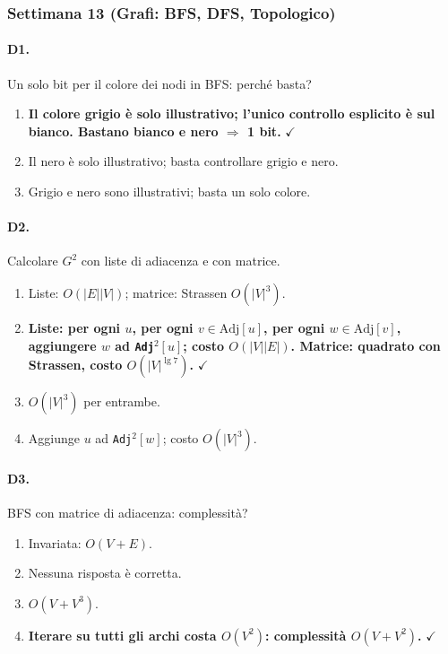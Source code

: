 \subsubsection{Settimana 13 (Grafi: BFS, DFS, Topologico)}

\paragraph{D1.} Un solo bit per il colore dei nodi in BFS: perch\'e basta?
\begin{enumerate}[label=\Alph*.,leftmargin=*]
	\item \textcolor{correctgreen}{\textbf{Il colore grigio \`e solo illustrativo; l'unico controllo esplicito \`e sul bianco. Bastano bianco e nero $\Rightarrow$ 1 bit.}} \hfill\textcolor{correctgreen}{$\checkmark$}
	\item Il nero \`e solo illustrativo; basta controllare grigio e nero.
	\item Grigio e nero sono illustrativi; basta un solo colore.
\end{enumerate}

\paragraph{D2.} Calcolare $G^2$ con liste di adiacenza e con matrice.
\begin{enumerate}[label=\Alph*.,leftmargin=*]
	\item Liste: $O(|E||V|)$; matrice: Strassen $O(|V|^3)$.
	\item \textcolor{correctgreen}{\textbf{Liste: per ogni $u$, per ogni $v\in\text{Adj}[u]$, per ogni $w\in\text{Adj}[v]$, aggiungere $w$ ad \texttt{Adj}$^2[u]$; costo $O(|V||E|)$. Matrice: quadrato con Strassen, costo $O(|V|^{\lg 7})$.}} \hfill\textcolor{correctgreen}{$\checkmark$}
	\item $O(|V|^3)$ per entrambe.
	\item Aggiunge $u$ ad \texttt{Adj}$^2[w]$; costo $O(|V|^3)$.
\end{enumerate}

\paragraph{D3.} BFS con matrice di adiacenza: complessit\`a?
\begin{enumerate}[label=\Alph*.,leftmargin=*]
	\item Invariata: $O(V+E)$.
	\item Nessuna risposta \`e corretta.
	\item $O(V+V^3)$.
	\item \textcolor{correctgreen}{\textbf{Iterare su tutti gli archi costa $O(V^2)$: complessit\`a $O(V+V^2)$.}} \hfill\textcolor{correctgreen}{$\checkmark$}
\end{enumerate}

